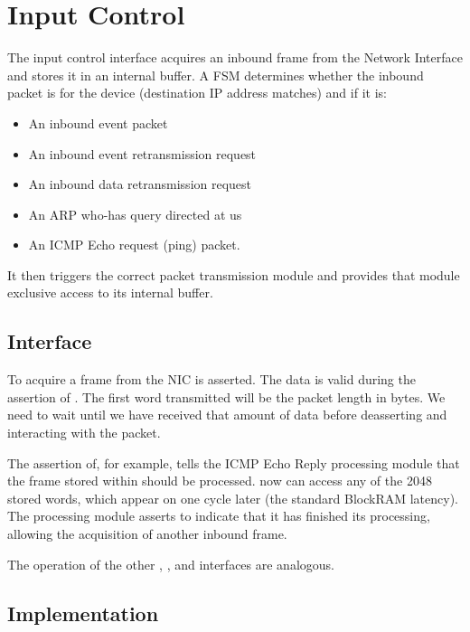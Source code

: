 \section{Input Control}

The input control interface acquires an inbound frame from the Network
Interface and stores it in an internal buffer. A FSM determines
whether the inbound packet is for the device (destination IP address
matches) and if it is: 

\begin{itemize}
\item An inbound event packet
\item An inbound event retransmission request
\item An inbound data retransmission request
\item An ARP who-has query directed at us
\item An ICMP Echo request (ping) packet. 
\end{itemize}

It then triggers the correct packet transmission module and provides
that module exclusive access to its internal buffer.


\subsection{Interface}
To acquire a frame from the NIC  is asserted.  The
data is valid during the assertion of . The first word
transmitted will be the packet length in bytes. We need to wait until
we have received that amount of data before deasserting
 and interacting with the packet.

The assertion of, for example,  tells the ICMP Echo
Reply processing module that the frame stored within should be
processed.  now can access any of the 2048
stored words, which appear on  one cycle later
(the standard BlockRAM latency). The processing module asserts
 to indicate that it has finished its processing,
allowing the acquisition of another inbound frame.

The operation of the other , , and
 interfaces are analogous.

\subsection{Implementation} 

